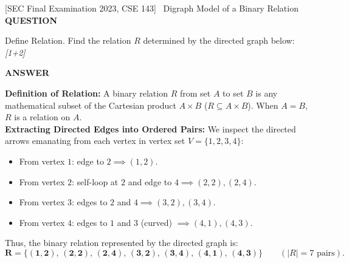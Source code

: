 \documentclass[11pt,a4paper]{article}
\newcommand{\Qlabel}{\textbf{\color{navy}\footnotesize\MakeUppercase{Question}}\par\smallskip}
\newcommand{\Alabel}{\textbf{\color{teal}\footnotesize\MakeUppercase{Answer}}\par\smallskip}
\begin{document}
\begin{exambox}{[SEC Final Examination 2023, CSE 143] \ Digraph Model of a Binary Relation}
\Qlabel
Define Relation. Find the relation $R$ determined by the directed graph below: \hfill\textit{[1+2]}
\begin{center}
\end{center}
\tcblower
\Alabel
\textbf{Definition of Relation:} A binary relation $R$ from set $A$ to set $B$ is any mathematical subset of the Cartesian product $A \times B$ ($R \subseteq A \times B$). When $A = B$, $R$ is a relation on $A$.\\[4pt]
\textbf{Extracting Directed Edges into Ordered Pairs:}
We inspect the directed arrows emanating from each vertex in vertex set $V = \{1, 2, 3, 4\}$:
\begin{itemize}
    \item From vertex $1$: edge to $2 \implies (1, 2)$.
    \item From vertex $2$: self-loop at $2$ and edge to $4 \implies (2, 2), (2, 4)$.
    \item From vertex $3$: edges to $2$ and $4 \implies (3, 2), (3, 4)$.
    \item From vertex $4$: edges to $1$ and $3$ (curved) $\implies (4, 1), (4, 3)$.
\end{itemize}
Thus, the binary relation represented by the directed graph is:
\[
\mathbf{R = \big\{ (1, 2), \, (2, 2), \, (2, 4), \, (3, 2), \, (3, 4), \, (4, 1), \, (4, 3) \big\}} \qquad (|R| = 7 \text{ pairs}).
\]
\end{exambox}
\end{document}
